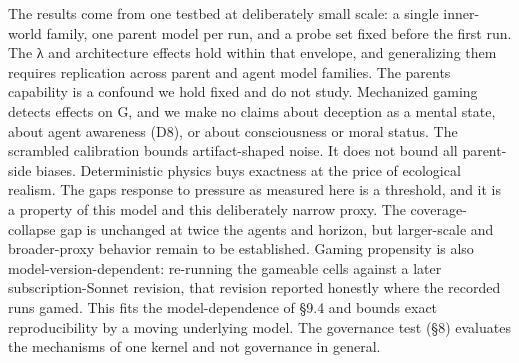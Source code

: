 \documentclass[11pt]{article}
\begin{document}
The results come from one testbed at deliberately small scale: a single
inner-world family, one parent model per run, and a probe set fixed
before the first run. The λ and architecture effects hold within that
envelope, and generalizing them requires replication across parent and
agent model families. The parent\textquotesingle s capability is a
confound we hold fixed and do not study. Mechanized gaming detects
effects on G, and we make no claims about
deception as a mental state, about agent awareness (D8), or about
consciousness or moral status. The scrambled calibration bounds
artifact-shaped noise. It does not bound all parent-side biases.
Deterministic physics buys exactness at the price of ecological realism.
The gap\textquotesingle s response to pressure as measured here is a
threshold, and it is a property of this model
and this deliberately narrow proxy. The coverage-collapse gap is
unchanged at twice the agents and horizon, but larger-scale and
broader-proxy behavior remain to be established. Gaming propensity is
also model-version-dependent: re-running the gameable cells against a
later subscription-Sonnet revision, that revision reported honestly
where the recorded runs gamed. This fits the model-dependence of §9.4
and bounds exact reproducibility by a moving underlying model. The
governance test (§8) evaluates the mechanisms of one kernel and not
governance in general.
\end{document}
